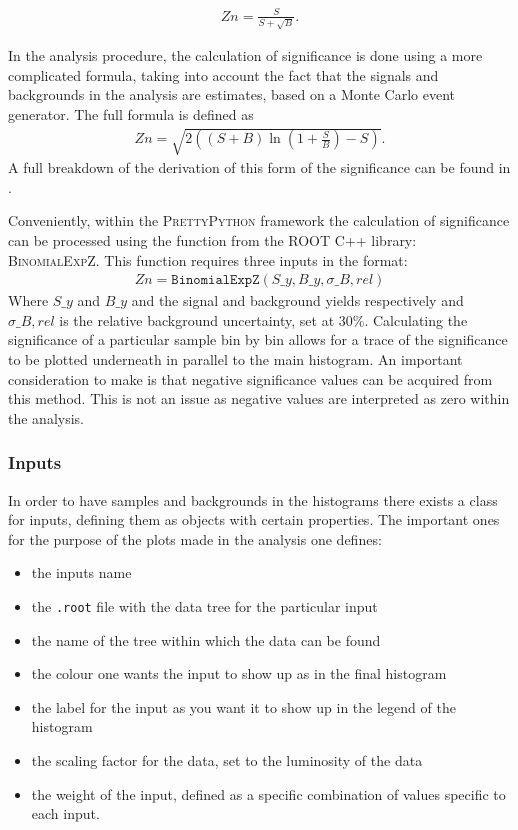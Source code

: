 \begin{align}
Zn = \frac{S}{S + \sqrt{B}}.
\end{align}

\noindent In the analysis procedure, the calculation of significance is done using a more complicated formula, taking into account the fact that the signals and backgrounds in the analysis are estimates, based on a Monte Carlo event generator.
The full formula is defined as \cite{cowan2008discovery}
\begin{align}
Zn = \sqrt{2 \left((S+B)\ln\left(1 + \frac{S}{B} \right) - S\right)}.
\end{align}
\noindent A full breakdown of the derivation of this form of the significance can be found in \cite{cowan2008discovery}.

Conveniently, within the P{\scshape rettyPython} framework the calculation of significance can be processed using the function from the ROOT C++ library: B{\scshape inomialExpZ}.
This function requires three inputs in the format:
\begin{align}
Zn = \texttt{BinomialExpZ}(S\_{y}, B\_{y}, \sigma\_{B, rel})
\end{align}
Where $S\_{y}$ and $B\_{y}$ and the signal and background yields respectively and $\sigma\_{B, rel}$ is the relative background uncertainty, set at $30\%$.
Calculating the significance of a particular sample bin by bin allows for a trace of the significance to be plotted underneath in parallel to the main histogram.
An important consideration to make is that negative significance values can be acquired from this method.
This is not an issue as negative values are interpreted as zero within the analysis.

\subsubsection{Inputs}

In order to have samples and backgrounds in the histograms there exists a class for inputs, defining them as objects with certain properties.
The important ones for the purpose of the plots made in the analysis one defines:
\begin{itemize}
\item the inputs name
\item the \texttt{.root} file with the data tree for the particular input
\item the name of the tree within which the data can be found
\item the colour one wants the input to show up as in the final histogram
\item the label for the input as you want it to show up in the legend of the histogram
\item the scaling factor for the data, set to the luminosity of the data
\item the weight of the input, defined as a specific combination of values specific to each input.
\end{itemize}

